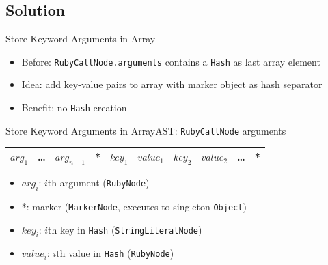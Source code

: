 \documentclass[xcolor=dvipsname,handout]{beamer} %
\begin{document}
\subsection{Solution}
\begin{frame}{Store Keyword Arguments in Array}
\begin{itemize}
    \item Before: \lstinline{RubyCallNode.arguments} contains a \lstinline{Hash} as last array element
    \item Idea: add key-value pairs to array with marker object as hash separator
    \item Benefit: no \lstinline{Hash} creation
\end{itemize}
\end{frame}

\begin{frame}{Store Keyword Arguments in Array}{AST: \lstinline{RubyCallNode} arguments}
\begin{table}
\begin{tabular}{|c|c|c|c|c|c|c|c|c|c|}
\hline
$\mathit{arg}_1$ & \ldots & $\mathit{arg}_{n-1}$ & * & $\mathit{key}_1$ & $\mathit{value}_1$ & $\mathit{key}_2$ & $\mathit{value}_2$ & \ldots & * \\
\hline
\end{tabular}
\end{table}
\begin{itemize}
    \item $\mathit{arg}_i$: $i$th argument (\lstinline{RubyNode})
    \item *: marker (\lstinline{MarkerNode}, executes to singleton \lstinline{Object})
    \item $\mathit{key}_i$: $i$th key in \lstinline{Hash} (\lstinline{StringLiteralNode})
    \item $\mathit{value}_i$: $i$th value in \lstinline{Hash} (\lstinline{RubyNode})
\end{itemize}
\end{frame}

\end{document}
